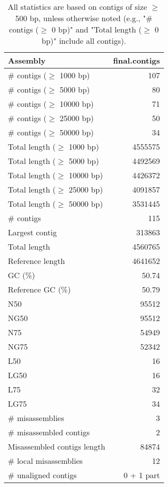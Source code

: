 \documentclass[12pt,a4paper]{article}
\begin{document}
\begin{table}[ht]
\begin{center}
\caption{All statistics are based on contigs of size $\geq$ 500 bp, unless otherwise noted (e.g., "\# contigs ($\geq$ 0 bp)" and "Total length ($\geq$ 0 bp)" include all contigs).}
\begin{tabular}{|l*{1}{|r}|}
\hline
Assembly & final.contigs \\ \hline
\# contigs ($\geq$ 1000 bp) & 107 \\ \hline
\# contigs ($\geq$ 5000 bp) & 80 \\ \hline
\# contigs ($\geq$ 10000 bp) & 71 \\ \hline
\# contigs ($\geq$ 25000 bp) & 50 \\ \hline
\# contigs ($\geq$ 50000 bp) & 34 \\ \hline
Total length ($\geq$ 1000 bp) & 4555575 \\ \hline
Total length ($\geq$ 5000 bp) & 4492569 \\ \hline
Total length ($\geq$ 10000 bp) & 4426372 \\ \hline
Total length ($\geq$ 25000 bp) & 4091857 \\ \hline
Total length ($\geq$ 50000 bp) & 3531445 \\ \hline
\# contigs & 115 \\ \hline
Largest contig & 313863 \\ \hline
Total length & 4560765 \\ \hline
Reference length & 4641652 \\ \hline
GC (\%) & 50.74 \\ \hline
Reference GC (\%) & 50.79 \\ \hline
N50 & 95512 \\ \hline
NG50 & 95512 \\ \hline
N75 & 54949 \\ \hline
NG75 & 52342 \\ \hline
L50 & 16 \\ \hline
LG50 & 16 \\ \hline
L75 & 32 \\ \hline
LG75 & 34 \\ \hline
\# misassemblies & 3 \\ \hline
\# misassembled contigs & 2 \\ \hline
Misassembled contigs length & 84874 \\ \hline
\# local misassemblies & 12 \\ \hline
\# unaligned contigs & 0 + 1 part \\ \hline

\end{tabular}
\end{center}
\end{table}
\end{document}
